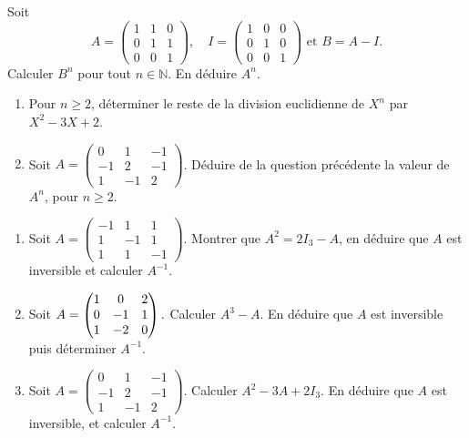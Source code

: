 \documentclass{book}
\begin{document}
\begin{Exercice}

Soit $$A=\left(
\begin{array}{ccc}
1&1&0\\
0&1&1\\
0&0&1
\end{array}\right),\quad
I=\left(
\begin{array}{ccc}
1&0&0\\
0&1&0\\
0&0&1
\end{array}\right)\textrm{ et }
B=A-I.$$
Calculer $B^n$ pour tout $n\in\mathbb N$. En déduire $A^n$.
\end{Exercice}

\begin{Exercice}

\begin{enumerate}
\item Pour $n\geq 2$, déterminer le reste de la division euclidienne de $X^n$ par $X^2-3X+2$.
\item Soit  $A=\begin{pmatrix} 
0&1&-1\\
-1&2&-1\\
1&-1&2
\end{pmatrix}$. Déduire de la question précédente la valeur de $A^n$, pour $n\geq 2$.
\end{enumerate}
\end{Exercice}

\begin{Exercice}

\begin{enumerate}
\item Soit $A=\left(
\begin{array}{ccc}
-1&1&1\\
1&-1&1\\
1&1&-1
\end{array}\right)$. Montrer que $A^2=2I_3-A$, en déduire que $A$ est inversible et calculer $A^{-1}$.
\item  Soit $ A=\begin{pmatrix} 1 & 0 & 2 \cr
0 & -1 & 1 \cr
1 & -2 & 0 \cr \end{pmatrix} .$ Calculer $
A^3-A .$ En déduire
que $ A $ est inversible puis déterminer $ A^{-1} .$ 
\item Soit $A=\begin{pmatrix} 
0&1&-1\\
-1&2&-1\\
1&-1&2
\end{pmatrix}$. Calculer $A^2-3A+2I_3$. En déduire que $A$ est inversible, et calculer $A^{-1}$.
\end{enumerate}
\end{Exercice}
\end{document}
